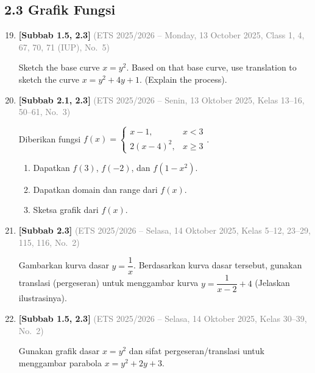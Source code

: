 \documentclass[10pt,openany,a4paper]{article}
\theoremstyle{definition}
\theoremstyle{definition}
\theoremstyle{plain}
\begin{document}
\subsection*{2.3 \quad Grafik Fungsi}
\begin{enumerate}
\setcounter{enumi}{18}
    \item \textbf{[Subbab 1.5, 2.3]} {\footnotesize\textcolor{gray}{(ETS 2025/2026 -- Monday, 13 October 2025, Class 1, 4, 67, 70, 71 (IUP), No.~5)}}\par
    Sketch the base curve $x = y^2$. Based on that base curve, use translation to sketch the curve $x = y^2 + 4y + 1$. (Explain the process).

    \item \textbf{[Subbab 2.1, 2.3]} {\footnotesize\textcolor{gray}{(ETS 2025/2026 -- Senin, 13 Oktober 2025, Kelas 13--16, 50--61, No.~3)}}\par
    Diberikan fungsi $f(x)=\begin{cases}
        x-1, &x<3\\
        2(x-4)^2, &x\geq 3
    \end{cases}$.
    \begin{enumerate}
        \item Dapatkan $f(3)$, $f(-2)$, dan $f(1-x^2)$.
        \item Dapatkan domain dan range dari $f(x)$.
        \item Sketsa grafik dari $f(x)$.
    \end{enumerate}

    \item \textbf{[Subbab 2.3]} {\footnotesize\textcolor{gray}{(ETS 2025/2026 -- Selasa, 14 Oktober 2025, Kelas 5--12, 23--29, 115, 116, No.~2)}}\par
    Gambarkan kurva dasar $y=\dfrac{1}{x}$. Berdasarkan kurva dasar tersebut, gunakan translasi (pergeseran) untuk menggambar kurva $y=\dfrac{1}{x-2}+4$ (Jelaskan ilustrasinya).

    \item \textbf{[Subbab 1.5, 2.3]} {\footnotesize\textcolor{gray}{(ETS 2025/2026 -- Selasa, 14 Oktober 2025, Kelas 30--39, No.~2)}}\par
    Gunakan grafik dasar $x=y^2$ dan sifat pergeseran/translasi untuk menggambar parabola $x=y^2+2y+3$.

\end{enumerate}
\end{document}
